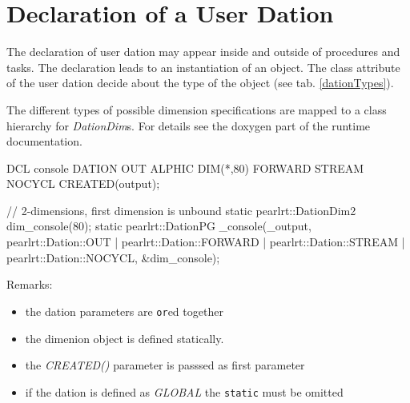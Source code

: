 \section{Declaration of a User Dation}
The declaration of user dation may appear inside and outside of procedures and 
tasks.
The declaration leads to an instantiation of an object. 
The class attribute of the user dation decide about the type of the object
(see tab. \ref{dationTypes}).

The different types of possible dimension specifications are mapped to
a class hierarchy for {\em DationDim}s. For details see the doxygen part 
of the runtime documentation.

\begin{PEARLCode}
DCL console DATION OUT ALPHIC DIM(*,80) FORWARD STREAM NOCYCL CREATED(output);
\end{PEARLCode}

\begin{CppCode} 
// 2-dimensions, first dimension is unbound
static pearlrt::DationDim2 dim_console(80);
static pearlrt::DationPG _console(_output, 
                pearlrt::Dation::OUT      |
                pearlrt::Dation::FORWARD  | 
                pearlrt::Dation::STREAM   |
                pearlrt::Dation::NOCYCL,
                &dim_console);
\end{CppCode}

Remarks:
\begin{itemize}
\item the dation parameters are \verb|or|ed together
\item the dimenion object is defined statically. 
\item the {\em CREATED()} parameter is passsed as first parameter
\item if the dation is defined as {\em GLOBAL} the \verb|static| must
  be omitted
\end{itemize}

